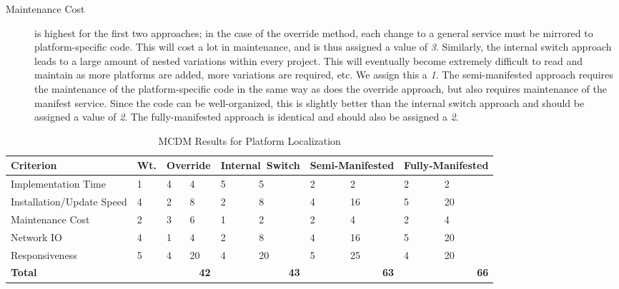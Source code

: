 \documentclass[12pt]{article}
\begin{document}
\begin{description}
\item[Maintenance Cost] is highest for the first two approaches; in the case of the override method, each change to a general service must be mirrored to platform-specific code. This will cost a lot in maintenance, and is thus assigned a value of {\it 3}. Similarly, the internal switch approach leads to a large amount of nested variations within every project. This will eventually become extremely difficult to read and maintain as more platforms are added, more variations are required, etc. We assign this a {\it 1}. The semi-manifested approach requires the maintenance of the platform-specific code in the same way as does the override approach, but also requires maintenance of the manifest service. Since the code can be well-organized, this is slightly better than the internal switch approach and should be assigned a value of {\it 2}. The fully-manifested approach is identical and should also be assigned a {\it 2}.
\end{description}

\begin{table}[ht]
\caption{MCDM Results for Platform Localization}
\label{tbl:mcdm-pltfrmlclztn}
\centering
\begin{tabular}{|p{4.5cm}|p{0.65cm}|p{0.55cm}|p{0.55cm}|p{1.15cm}|p{1.15cm}|p{0.75cm}|p{0.75cm}|p{0.75cm}|p{0.75cm}|}
    \hline
    {\bf Criterion} & {\bf Wt.} & \multicolumn{2}{|p{1.1cm}|}{{\bf Override}} & \multicolumn{2}{|p{2.3cm}|}{{\bf \mbox{Internal Switch}}} & \multicolumn{2}{|p{1.5cm}|}{{\bf Semi-Manifested}} & \multicolumn{2}{|p{1.5cm}|}{{\bf Fully-Manifested}} \\
    \hline
    \hline
    Implementation Time       &  1 & 4 &  4 & 5 &  5 & 2 &  2 & 2 &  2 \\
    Installation/Update Speed &  4 & 2 &  8 & 2 &  8 & 4 & 16 & 5 & 20 \\
    Maintenance Cost          &  2 & 3 &  6 & 1 &  2 & 2 &  4 & 2 &  4 \\
    Network IO                &  4 & 1 &  4 & 2 &  8 & 4 & 16 & 5 & 20 \\
    Responsiveness            &  5 & 4 & 20 & 4 & 20 & 5 & 25 & 4 & 20 \\
    \hline
    \hline
    {\bf Total}               &    & \multicolumn{2}{|r|}{{\bf 42}} & \multicolumn{2}{|r|}{{\bf 43}} & \multicolumn{2}{|r|}{{\bf 63}} & \multicolumn{2}{|r|}{{\bf 66}} \\
    \hline
\end{tabular}
\end{table}
\end{document}
